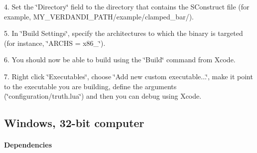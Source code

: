\documentclass{tufte-book}
\begin{document}
\begin{itemize}
4. \-Set the \char`\"{}\-Directory\char`\"{} field to the directory that contains the \-S\-Construct file (for example, {\ttfamily \-M\-Y\-\_\-\-V\-E\-R\-D\-A\-N\-D\-I\-\_\-\-P\-A\-T\-H/example/clamped\-\_\-bar/}).

5. \-In \char`\"{}\-Build Settings\char`\"{}, specify the architectures to which the binary is targeted (for instance, \char`\"{}\-A\-R\-C\-H\-S = x86\-\_\char`\"{}).

6. \-You should now be able to build using the \char`\"{}\-Build\char`\"{} command from \-Xcode.

7. \-Right click \char`\"{}\-Executables\char`\"{}, choose \char`\"{}\-Add new custom executable...\char`\"{}, make it point to the executable you are building, define the arguments (\char`\"{}configuration/truth.\-lua\char`\"{}) and then you can debug using \-Xcode.

\end{itemize}

\hypertarget{installation_windows}{}\subsection{\-Windows, 32-\/bit computer}\label{installation_windows}

\hypertarget{installation_windows_dependencies}{}\paragraph{\-Dependencies}\label{installation_windows_dependencies}
\end{document}
